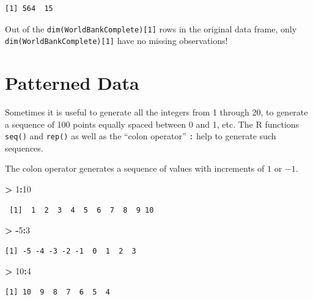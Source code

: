 \documentclass[]{krantz}
\makeatletter
\newenvironment{Shaded}{\begin{snugshade}}{\end{snugshade}}
\newcommand{\DecValTok}[1]{\textcolor[rgb]{0.06,0.06,0.06}{#1}}
\newcommand{\StringTok}[1]{\textcolor[rgb]{0.5,0.5,0.5}{#1}}
\newcommand{\OperatorTok}[1]{\textcolor[rgb]{0.43,0.43,0.43}{\textbf{#1}}}
\newenvironment{kframe}{%
\medskip{}
\setlength{\fboxsep}{.8em}
 \def\at@end@of@kframe{}%
 \ifinner\ifhmode%
  \def\at@end@of@kframe{\end{minipage}}%
  \begin{minipage}{\columnwidth}%
 \fi\fi%
 \def\FrameCommand##1{\hskip\@totalleftmargin \hskip-\fboxsep
 \colorbox{shadecolor}{##1}\hskip-\fboxsep
     \hskip-\linewidth \hskip-\@totalleftmargin \hskip\columnwidth}%
 \MakeFramed {\advance\hsize-\width
   \@totalleftmargin\z@ \linewidth\hsize
   \@setminipage}}%
 {\par\unskip\endMakeFramed%
 \at@end@of@kframe}
\renewenvironment{Shaded}{\begin{kframe}}{\end{kframe}}
\makeatother
\begin{document}
\begin{verbatim}
[1] 564  15
\end{verbatim}

Out of the \texttt{dim(WorldBankComplete){[}1{]}} rows in the original
data frame, only \texttt{dim(WorldBankComplete){[}1{]}} have no missing
observations!

\section{Patterned Data}\label{patterned-data}

Sometimes it is useful to generate all the integers from 1 through 20,
to generate a sequence of 100 points equally spaced between 0 and 1,
etc. The R functions \texttt{seq()} and \texttt{rep()} as well as the
``colon operator'' \texttt{:} help to generate such sequences.

The colon operator generates a sequence of values with increments of
\(1\) or \(-1\).

\begin{Shaded}
\begin{Highlighting}[]
\OperatorTok{>}\StringTok{ }\DecValTok{1}\OperatorTok{:}\DecValTok{10}
\end{Highlighting}
\end{Shaded}

\begin{verbatim}
 [1]  1  2  3  4  5  6  7  8  9 10
\end{verbatim}

\begin{Shaded}
\begin{Highlighting}[]
\OperatorTok{>}\StringTok{ }\OperatorTok{-}\DecValTok{5}\OperatorTok{:}\DecValTok{3}
\end{Highlighting}
\end{Shaded}

\begin{verbatim}
[1] -5 -4 -3 -2 -1  0  1  2  3
\end{verbatim}

\begin{Shaded}
\begin{Highlighting}[]
\OperatorTok{>}\StringTok{ }\DecValTok{10}\OperatorTok{:}\DecValTok{4}
\end{Highlighting}
\end{Shaded}

\begin{verbatim}
[1] 10  9  8  7  6  5  4
\end{verbatim}
\end{document}
